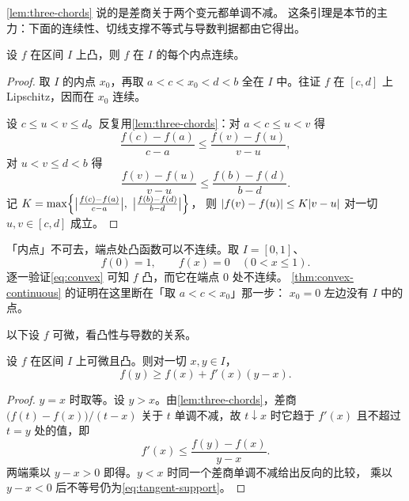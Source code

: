 \begin{remark}
  \cref{lem:three-chords} 说的是差商关于两个变元都单调不减。
  这条引理是本节的主力：下面的连续性、切线支撑不等式与导数判据都由它得出。
\end{remark}

\begin{theorem}[凸函数在内点连续]
  \label{thm:convex-continuous}
  设 \(f\) 在区间 \(I\) 上凸，则 \(f\) 在 \(I\) 的每个内点连续。
\end{theorem}

\begin{proof}
  取 \(I\) 的内点 \(x_{0}\)，再取 \(a<c<x_{0}<d<b\) 全在 \(I\) 中。往证 \(f\) 在 \([c,d]\) 上
  Lipschitz，因而在 \(x_{0}\) 连续。

  设 \(c \le u < v \le d\)。反复用\cref{lem:three-chords}：对 \(a<c\le u<v\) 得
  \[
    \frac{f(c)-f(a)}{c-a} \le \frac{f(v)-f(u)}{v-u} ,
  \]
  对 \(u<v \le d<b\) 得
  \[
    \frac{f(v)-f(u)}{v-u} \le \frac{f(b)-f(d)}{b-d} .
  \]
  记 \(K = \max\Bigl\{\bigl|\tfrac{f(c)-f(a)}{c-a}\bigr|,\ \bigl|\tfrac{f(b)-f(d)}{b-d}\bigr|\Bigr\}\)，
  则 \(\lvert f(v)-f(u)\rvert \le K\lvert v-u\rvert\) 对一切 \(u,v \in [c,d]\) 成立。
\end{proof}

\begin{pitfall}
  「内点」不可去，端点处凸函数可以不连续。取 \(I=[0,1]\)、
  \[
    f(0)=1, \qquad f(x)=0 \quad (0<x\le1) .
  \]
  逐一验证\cref{eq:convex} 可知 \(f\) 凸，而它在端点 \(0\) 处不连续。
  \cref{thm:convex-continuous} 的证明在这里断在「取 \(a<c<x_{0}\)」那一步：
  \(x_{0}=0\) 左边没有 \(I\) 中的点。
\end{pitfall}

以下设 \(f\) 可微，看凸性与导数的关系。

\begin{proposition}[切线支撑不等式]
  \label{prop:tangent-support}
  设 \(f\) 在区间 \(I\) 上可微且凸。则对一切 \(x,y \in I\)，
  \begin{equation}
    \label{eq:tangent-support}
    f(y) \ge f(x) + f'(x)(y-x) .
  \end{equation}
\end{proposition}

\begin{proof}
  \(y=x\) 时取等。设 \(y>x\)。由\cref{lem:three-chords}，差商
  \(\bigl(f(t)-f(x)\bigr)/(t-x)\) 关于 \(t\) 单调不减，故 \(t \downarrow x\) 时它趋于
  \(f'(x)\) 且不超过 \(t=y\) 处的值，即
  \[
    f'(x) \le \frac{f(y)-f(x)}{y-x} .
  \]
  两端乘以 \(y-x>0\) 即得。\(y<x\) 时同一个差商单调不减给出反向的比较，
  乘以 \(y-x<0\) 后不等号仍为\cref{eq:tangent-support}。
\end{proof}

